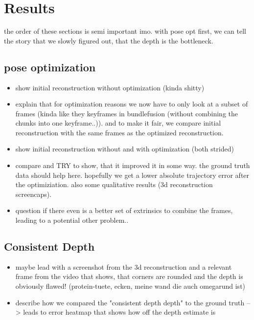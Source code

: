 \chapter{Results}
    the order of these sections is semi important imo. with pose opt first, we can tell the story that we slowly figured out, that the depth is the bottleneck.
    \section{pose optimization}
        \begin{itemize}
            \item show initial reconstruction without optimization (kinda shitty)
            \item explain that for optimization reasons we now have to only look at a subset of frames (kinda like they keyframes in bundlefusion (without combining the chunks into one keyframe..)). and to make it fair, we compare initial reconstruction with the same frames as the optimized reconstruction.
            \item show initial reconstruction without and with optimization (both strided)
            \item compare and TRY to show, that it improved it in some way. the ground truth data should help here. hopefully we get a lower absolute trajectory error after the optimiziation. also some qualitative results (3d reconstruction screencaps).
            \item question if there even is a better set of extrinsics to combine the frames, leading to a potential other problem..
        \end{itemize}
    \section{Consistent Depth}
        \begin{itemize}
            \item maybe lead with a screenshot from the 3d reconstruction and a relevant frame from the video that shows, that corners are rounded and the depth is obviously flawed! (protein-tuete, ecken, meine wand die auch omegarund ist)
            \item describe how we compared the "consistent depth depth" to the ground truth --> leads to error heatmap that shows how off the depth estimate is
        \end{itemize}